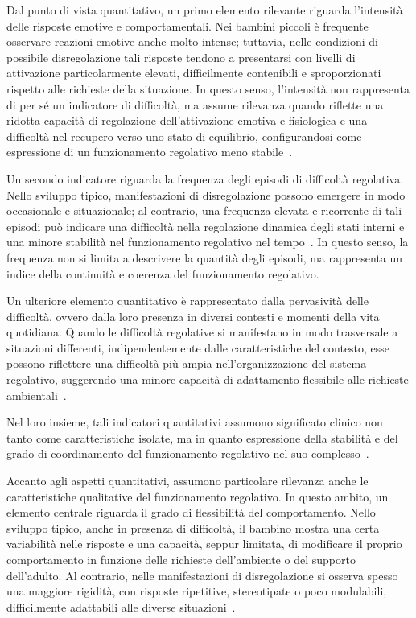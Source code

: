             Dal punto di vista quantitativo, un primo elemento rilevante riguarda l'intensità delle risposte emotive e comportamentali. Nei bambini piccoli è frequente osservare reazioni emotive anche molto intense; tuttavia, nelle condizioni di possibile disregolazione tali risposte tendono a presentarsi con livelli di attivazione particolarmente elevati, difficilmente contenibili e sproporzionati rispetto alle richieste della situazione. In questo senso, l'intensità non rappresenta di per sé un indicatore di difficoltà, ma assume rilevanza quando riflette una ridotta capacità di regolazione dell'attivazione emotiva e fisiologica e una difficoltà nel recupero verso uno stato di equilibrio, configurandosi come espressione di un funzionamento regolativo meno stabile~\cite{eisenberg2010,beauchaine2015}.

            Un secondo indicatore riguarda la frequenza degli episodi di difficoltà regolativa. Nello sviluppo tipico, manifestazioni di disregolazione possono emergere in modo occasionale e situazionale; al contrario, una frequenza elevata e ricorrente di tali episodi può indicare una difficoltà nella regolazione dinamica degli stati interni e una minore stabilità nel funzionamento regolativo nel tempo~\cite{cole1994}. In questo senso, la frequenza non si limita a descrivere la quantità degli episodi, ma rappresenta un indice della continuità e coerenza del funzionamento regolativo.

            Un ulteriore elemento quantitativo è rappresentato dalla pervasività delle difficoltà, ovvero dalla loro presenza in diversi contesti e momenti della vita quotidiana. Quando le difficoltà regolative si manifestano in modo trasversale a situazioni differenti, indipendentemente dalle caratteristiche del contesto, esse possono riflettere una difficoltà più ampia nell'organizzazione del sistema regolativo, suggerendo una minore capacità di adattamento flessibile alle richieste ambientali~\cite{cole1994}.

            Nel loro insieme, tali indicatori quantitativi assumono significato clinico non tanto come caratteristiche isolate, ma in quanto espressione della stabilità e del grado di coordinamento del funzionamento regolativo nel suo complesso~\cite{calkins2007}.

            Accanto agli aspetti quantitativi, assumono particolare rilevanza anche le caratteristiche qualitative del funzionamento regolativo. In questo ambito, un elemento centrale riguarda il grado di flessibilità del comportamento. Nello sviluppo tipico, anche in presenza di difficoltà, il bambino mostra una certa variabilità nelle risposte e una capacità, seppur limitata, di modificare il proprio comportamento in funzione delle richieste dell'ambiente o del supporto dell'adulto. Al contrario, nelle manifestazioni di disregolazione si osserva spesso una maggiore rigidità, con risposte ripetitive, stereotipate o poco modulabili, difficilmente adattabili alle diverse situazioni~\cite{morris2007}.

